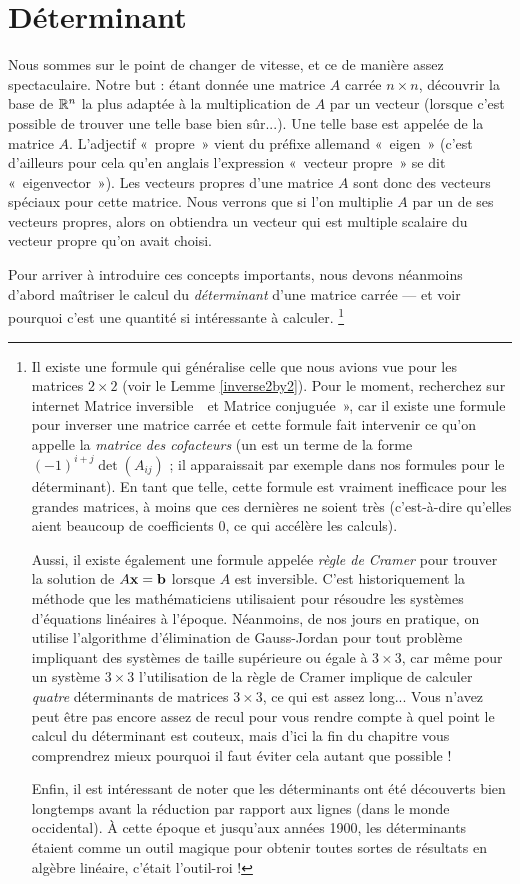 \chapter{D\'eterminant}
\label{chapter:Fr_25-determinants}
Nous sommes sur le point de changer de vitesse, et ce de manière assez spectaculaire.  
Notre but : étant donnée une matrice $A$ carrée $n\times n$, découvrir la base de $\mathbb{R}^n$ la plus adaptée à la multiplication de $A$ par un vecteur (lorsque c'est possible de trouver une telle base bien sûr...).
Une telle base est appelée  de la matrice $A$. L'adjectif «~propre~» vient du préfixe allemand «~eigen~» (c'est d'ailleurs pour cela qu'en anglais l'expression «~vecteur propre~» se dit «~eigenvector~»). Les vecteurs propres d'une matrice $A$ sont donc des vecteurs spéciaux pour cette matrice. Nous verrons que si l'on multiplie $A$ par un de ses vecteurs propres, alors on obtiendra un vecteur qui est multiple scalaire du vecteur propre qu'on avait choisi.


Pour arriver à introduire ces concepts importants, nous devons néanmoins d'abord maîtriser le calcul du
{\it déterminant} d'une matrice carrée --- et voir pourquoi c'est une quantité si intéressante à calculer.
\footnote{Il existe une formule qui généralise celle que nous avions vue pour les matrices $2\times2$ (voir le Lemme \ref{inverse2by2}). Pour le moment, recherchez sur internet \og Matrice inversible\ \fg\ et \og Matrice conjuguée~», car il existe une formule pour inverser une matrice carrée et cette formule fait intervenir ce qu'on appelle la \emph{matrice des cofacteurs} (un  est un terme de la forme $(-1)^{i+j} \det(A_{ij})$ ; il apparaissait par exemple dans nos formules pour le déterminant).  En tant que telle, cette formule est 
vraiment inefficace pour les grandes matrices, à moins que ces dernières ne soient très  (c'est-à-dire qu'elles aient beaucoup de coefficients $0$, ce qui accélère les calculs). 

Aussi, il existe également une formule appelée {\it règle de Cramer} pour trouver la solution de $A\mathbf{x}=\mathbf{b}$ lorsque $A$ est inversible. C'est historiquement la méthode que les mathématiciens utilisaient pour résoudre les systèmes d'équations linéaires à l'époque.
Néanmoins, de nos jours en pratique, on utilise l'algorithme d'élimination de Gauss-Jordan pour tout problème impliquant des systèmes de taille supérieure ou égale à $3 \times 3$, car même pour un système  $3 \times 3$ l'utilisation de la règle de Cramer implique de calculer {\it quatre} déterminants de matrices $3 \times 3$, ce qui est assez long... Vous n'avez peut être pas encore assez de recul pour vous rendre compte à quel point le calcul du déterminant est couteux, mais d'ici la fin du chapitre vous comprendrez mieux pourquoi il faut éviter cela autant que possible ! 

Enfin, il est intéressant de noter que les déterminants ont été découverts 
bien longtemps avant la réduction par rapport aux lignes (dans le monde occidental). À cette époque et jusqu'aux années 1900, les déterminants étaient comme un outil magique
pour obtenir toutes sortes de résultats en algèbre linéaire, c'était l'outil-roi !}



